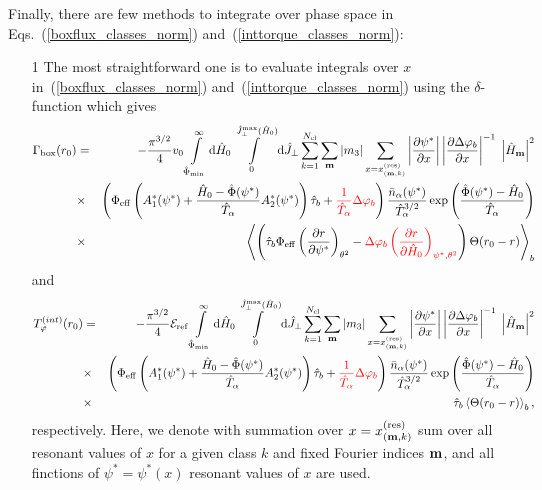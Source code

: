\documentclass[preprint,prb,aps]{revtex4-1}
\newcommand{\bea}[1]{\begin{eqnarray} \label{#1}}
\newcommand{\eea}{\end{eqnarray}}
\newcommand{\eq}[1]{(\ref{#1})}
\newcommand{\difp}[2]{\frac{\partial #1}{\partial #2}}
\renewcommand{\bm}{{\bf m}}
\newcommand{\rd}{{\rm d}}
\begin{document}
Finally, there are few methods to integrate over phase space
in Eqs.~\eq{boxflux_classes_norm} and~\eq{inttorque_classes_norm}:
\begin{itemize}
\item[1]
The most straightforward one is to evaluate integrals over 
$x$ in~\eq{boxflux_classes_norm} and~\eq{inttorque_classes_norm}
using the $\delta$-function which gives
\bea{boxflux_classes_norm_evald}
\Gamma_{\rm box}(r_0) &=&
-\frac{\pi^{3/2}}{4} v_0
\int\limits_{\hat\Phi_{\rm min}}^\infty \rd \hat H_0
\int\limits_0^{\hat J_\perp^{\rm max}(\hat H_0)} \rd \hat J_\perp
\sum\limits_{k=1}^{N_{\rm cl}}
\sum_\bm |m_3|
\sum_{x=x^{(\rm res)}_{(\bm,k)}}
\left|\difp{\psi^\ast}{x}\right|
\left|\difp{\Delta \varphi_b}{x}\right|^{-1}
\;\left|\hat H_{\bm}\right|^2
\nonumber \\
&\times&
\left(
\Phi_{\rm eff}
\left(
A^\ast_1(\psi^\ast)+
\frac{\hat H_0-\hat \Phi(\psi^\ast)}{\hat T_\alpha}
A^\ast_2(\psi^\ast)
\right)
\hat \tau_b
+{\color{red}\frac{1}{\hat T_\alpha}\Delta\varphi_b}
\right)
\frac{\bar n_\alpha(\psi^\ast)}{\hat T_\alpha^{3/2}}
\exp\left(\frac{\hat \Phi(\psi^\ast)-\hat H_0}{\hat T_\alpha}\right)
\nonumber \\
&\times&
\left\langle
\left(
\hat\tau_b \Phi_{\rm eff}
\left(\difp{r}{\psi^\ast}\right)_{\theta^2}
-{\color{red}\Delta\varphi_b\left(\difp{r}{\hat H_0}\right)_{\psi^\ast,\theta^2}}
\right)\Theta(r_0-r)
\right\rangle_b
\eea
and
\bea{inttorque_classes_norm_evald}
T_\varphi^{(int)}(r_0)
&=&
-\frac{\pi^{3/2}}{4} {\cal E}_{\rm ref}
\int\limits_{\hat\Phi_{\rm min}}^\infty \rd \hat H_0
\int\limits_0^{\hat J_\perp^{\rm max}(\hat H_0)} \rd \hat J_\perp
\sum\limits_{k=1}^{N_{\rm cl}}
\sum_\bm |m_3|
\sum_{x=x^{(\rm res)}_{(\bm,k)}}
\left|\difp{\psi^\ast}{x}\right|
\left|\difp{\Delta \varphi_b}{x}\right|^{-1}
\;\left|\hat H_{\bm}\right|^2
\nonumber \\
&\times&
\left(
\Phi_{\rm eff}
\left(
A^\ast_1(\psi^\ast)+
\frac{\hat H_0-\hat \Phi(\psi^\ast)}{\hat T_\alpha}
A^\ast_2(\psi^\ast)
\right)
\hat \tau_b
+{\color{red}\frac{1}{\hat T_\alpha}\Delta\varphi_b}
\right)
\frac{\bar n_\alpha(\psi^\ast)}{\hat T_\alpha^{3/2}}
\exp\left(\frac{\hat \Phi(\psi^\ast)-\hat H_0}{\hat T_\alpha}\right)
\nonumber \\
&\times&
\hat\tau_b 
\left\langle
\Theta(r_0-r)
\right\rangle_b,
\eea
respectively.
Here, we denote with summation over $x=x^{(\rm res)}_{(\bm,k)}$ sum over
all resonant values of $x$ for a given class $k$ and fixed Fourier indices $\bm$,
and all finctions of $\psi^\ast=\psi^\ast(x)$ resonant values of $x$ are used.

\end{itemize}
\end{document}
